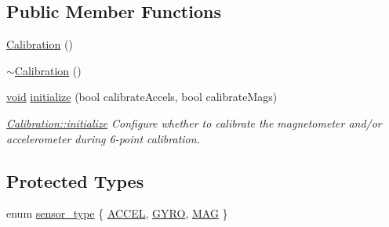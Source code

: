 \subsection*{\-Public \-Member \-Functions}
\begin{DoxyCompactItemize}
\item 
\hyperlink{class_calibration_a80f51a5ff7ec0f44d5388c9a61d1f20b}{\-Calibration} ()
\item 
\hyperlink{class_calibration_a108efb6ccd8c98e5cac950be4bf0ac26}{$\sim$\-Calibration} ()
\item 
\hyperlink{group___u_a_v_objects_plugin_ga444cf2ff3f0ecbe028adce838d373f5c}{void} \hyperlink{class_calibration_ab7f3ea695cee64e92f8fe59d546b134d}{initialize} (bool calibrate\-Accels, bool calibrate\-Mags)
\begin{DoxyCompactList}\small\item\em \hyperlink{class_calibration_ab7f3ea695cee64e92f8fe59d546b134d}{\-Calibration\-::initialize} \-Configure whether to calibrate the magnetometer and/or accelerometer during 6-\/point calibration. \end{DoxyCompactList}\end{DoxyCompactItemize}
\subsection*{\-Protected \-Types}
\begin{DoxyCompactItemize}
\item 
enum \hyperlink{class_calibration_ab4af1e75c9a40776a4c5ed1da5e7caf8}{sensor\-\_\-type} \{ \hyperlink{class_calibration_ab4af1e75c9a40776a4c5ed1da5e7caf8a3d0c57c4632846573b22a605d31d59fd}{\-A\-C\-C\-E\-L}, 
\hyperlink{class_calibration_ab4af1e75c9a40776a4c5ed1da5e7caf8a80751a325ad77e6a9240bc534ca9b5e8}{\-G\-Y\-R\-O}, 
\hyperlink{class_calibration_ab4af1e75c9a40776a4c5ed1da5e7caf8a40b1af5ef9ac8c8600e3190a06bf81ca}{\-M\-A\-G}
 \}
\end{DoxyCompactItemize}
